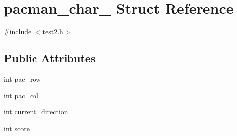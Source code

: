 \hypertarget{structpacman__char__2}{\section{pacman\-\_\-char\-\_ Struct Reference}
\label{structpacman__char__2}
}


{\ttfamily \#include $<$test2.\-h$>$}

\subsection*{Public Attributes}
\begin{DoxyCompactItemize}
\item 
int \hyperlink{structpacman__char__2_a7ea0aafb59b0e0a37cec73c92edbd3e5}{pac\-\_\-row}
\item 
int \hyperlink{structpacman__char__2_a8ff1ecd313b11ab1b48ac465d61ca5c9}{pac\-\_\-col}
\item 
int \hyperlink{structpacman__char__2_a30d19c18956c618a5cbee710d4c6f67f}{current\-\_\-direction}
\item 
int \hyperlink{structpacman__char__2_a9c37c17df5efa5fe759d6f01d04ee1af}{score}
\end{DoxyCompactItemize}


